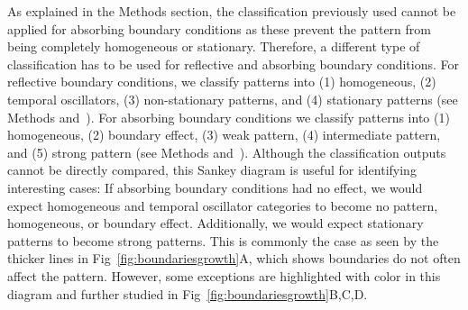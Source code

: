 \documentclass[10pt,letterpaper]{article}
\begin{document}
As explained in the Methods section, the classification previously used cannot be applied for absorbing boundary conditions as these prevent the pattern from being completely homogeneous or stationary.
Therefore, a different type of classification has to be used for reflective and absorbing boundary conditions.
For reflective boundary conditions, we classify patterns into (1) homogeneous, (2) temporal oscillators, (3) non-stationary patterns, and (4) stationary patterns (see Methods and~). For absorbing boundary conditions we classify patterns into (1) homogeneous, (2) boundary effect, (3) weak pattern, (4) intermediate pattern, and (5) strong pattern (see Methods and~).
Although the classification outputs cannot be directly compared, this Sankey diagram is useful for identifying interesting cases:
If absorbing boundary conditions had no effect, we would expect homogeneous and temporal oscillator categories to become no pattern, homogeneous, or boundary effect.
Additionally, we would expect stationary patterns to become strong patterns.
This is commonly the case as seen by the thicker lines in Fig~\ref{fig:boundariesgrowth}A, which shows boundaries do not often affect the pattern.
However, some exceptions are highlighted with color in this diagram and further studied in Fig~\ref{fig:boundariesgrowth}B,C,D.
\end{document}
